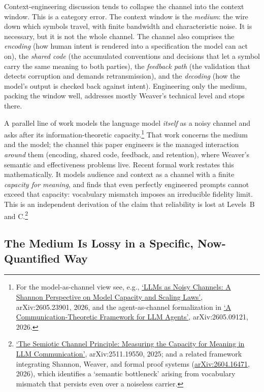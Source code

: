 \documentclass[11pt, a4paper]{article}
\begin{document}
Context-engineering discussion tends to collapse the channel into the context window. This is a
category error. The context window is the \emph{medium}: the wire down which symbols
travel, with finite bandwidth and characteristic noise. It is necessary, but it is not
the whole channel. The channel also comprises the \emph{encoding} (how human intent is
rendered into a specification the model can act on), the \emph{shared code} (the
accumulated conventions and decisions that let a symbol carry the same meaning to both
parties), the \emph{feedback path} (the validation that detects corruption and demands
retransmission), and the \emph{decoding} (how the model's output is checked back against
intent). Engineering only the medium, packing the window well, addresses mostly Weaver's
technical level and stops there.

A parallel line of work models the language model \emph{itself} as a noisy channel and
asks after its information-theoretic capacity.\footnote{For the model-as-channel view see, e.g.,
\href{https://arxiv.org/abs/2605.23901}{`LLMs as Noisy Channels: A Shannon Perspective on
Model Capacity and Scaling Laws'}, arXiv:2605.23901, 2026, and the agent-as-channel
formalization in \href{https://arxiv.org/abs/2605.09121}{`A Communication-Theoretic
Framework for LLM Agents'}, arXiv:2605.09121, 2026.} That work concerns the medium and the
model; the channel this paper engineers is the managed interaction \emph{around}
them (encoding, shared code, feedback, and retention), where Weaver's
semantic and effectiveness problems live. Recent formal work restates this mathematically. It models audience and context as a
channel with a finite \emph{capacity for meaning}, and finds that even perfectly engineered
prompts cannot exceed that capacity: vocabulary mismatch imposes an irreducible fidelity
limit. This is an independent derivation of the claim that reliability is lost at Levels~B
and C.\footnote{\href{https://arxiv.org/abs/2511.19550}{`The
Semiotic Channel Principle: Measuring the Capacity for Meaning in LLM Communication'},
arXiv:2511.19550, 2025; and a related framework integrating Shannon, Weaver, and formal
proof systems (\href{https://arxiv.org/abs/2604.16471}{arXiv:2604.16471}, 2026), which
identifies a `semantic bottleneck' arising
from vocabulary mismatch that persists even over a noiseless carrier.}

\subsection{The Medium Is Lossy in a Specific, Now-Quantified Way}
\end{document}
